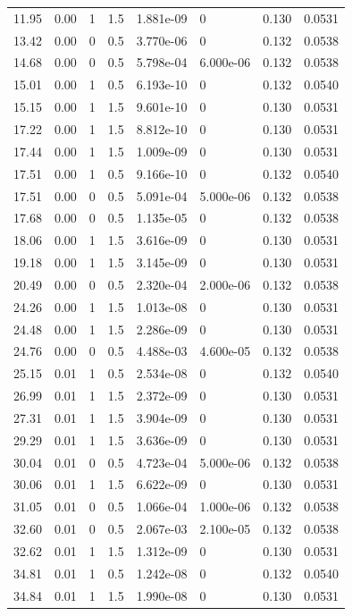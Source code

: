\documentclass[preview]{standalone}
\begin{document}
{{\begin{tabular}{L{1.2cm}C{1.2cm} C{0.3cm}C{0.5cm} C{1.4cm}C{1.4cm} C{1.4cm}C{1.4cm}}
  11.95  &  0.00  & 1     & 1.5 &  1.881e-09  & 0  & 0.130 &  0.0531   \\ 
  13.42  &  0.00  & 0     & 0.5 &  3.770e-06  & 0  & 0.132 &  0.0538   \\ 
  14.68  &  0.00  & 0     & 0.5 &  5.798e-04  & 6.000e-06  & 0.132 &  0.0538   \\ 
  15.01  &  0.00  & 1     & 0.5 &  6.193e-10  & 0  & 0.132 &  0.0540   \\ 
  15.15  &  0.00  & 1     & 1.5 &  9.601e-10  & 0  & 0.130 &  0.0531   \\ 
  17.22  &  0.00  & 1     & 1.5 &  8.812e-10  & 0  & 0.130 &  0.0531   \\ 
  17.44  &  0.00  & 1     & 1.5 &  1.009e-09  & 0  & 0.130 &  0.0531   \\ 
  17.51  &  0.00  & 1     & 0.5 &  9.166e-10  & 0  & 0.132 &  0.0540   \\ 
  17.51  &  0.00  & 0     & 0.5 &  5.091e-04  & 5.000e-06  & 0.132 &  0.0538   \\ 
  17.68  &  0.00  & 0     & 0.5 &  1.135e-05  & 0  & 0.132 &  0.0538   \\ 
  18.06  &  0.00  & 1     & 1.5 &  3.616e-09  & 0  & 0.130 &  0.0531   \\ 
  19.18  &  0.00  & 1     & 1.5 &  3.145e-09  & 0  & 0.130 &  0.0531   \\ 
  20.49  &  0.00  & 0     & 0.5 &  2.320e-04  & 2.000e-06  & 0.132 &  0.0538   \\ 
  24.26  &  0.00  & 1     & 1.5 &  1.013e-08  & 0  & 0.130 &  0.0531   \\ 
  24.48  &  0.00  & 1     & 1.5 &  2.286e-09  & 0  & 0.130 &  0.0531   \\ 
  24.76  &  0.00  & 0     & 0.5 &  4.488e-03  & 4.600e-05  & 0.132 &  0.0538   \\ 
  25.15  &  0.01  & 1     & 0.5 &  2.534e-08  & 0  & 0.132 &  0.0540   \\ 
  26.99  &  0.01  & 1     & 1.5 &  2.372e-09  & 0  & 0.130 &  0.0531   \\ 
  27.31  &  0.01  & 1     & 1.5 &  3.904e-09  & 0  & 0.130 &  0.0531   \\ 
  29.29  &  0.01  & 1     & 1.5 &  3.636e-09  & 0  & 0.130 &  0.0531   \\ 
  30.04  &  0.01  & 0     & 0.5 &  4.723e-04  & 5.000e-06  & 0.132 &  0.0538   \\ 
  30.06  &  0.01  & 1     & 1.5 &  6.622e-09  & 0  & 0.130 &  0.0531   \\ 
  31.05  &  0.01  & 0     & 0.5 &  1.066e-04  & 1.000e-06  & 0.132 &  0.0538   \\ 
  32.60  &  0.01  & 0     & 0.5 &  2.067e-03  & 2.100e-05  & 0.132 &  0.0538   \\ 
  32.62  &  0.01  & 1     & 1.5 &  1.312e-09  & 0  & 0.130 &  0.0531   \\ 
  34.81  &  0.01  & 1     & 0.5 &  1.242e-08  & 0  & 0.132 &  0.0540   \\ 
  34.84  &  0.01  & 1     & 1.5 &  1.990e-08  & 0  & 0.130 &  0.0531   \\ 
\hline 
\end{tabular} 

}}
\end{document}
